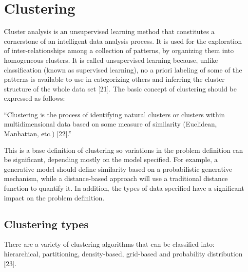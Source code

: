 \documentclass[
]{article}
\begin{document}
\hypertarget{clustering}{%
\section{\texorpdfstring{Clustering
\label{sec:clustering}}{Clustering }}\label{clustering}}

Cluster analysis is an unsupervised learning method that constitutes a
cornerstone of an intelligent data analysis process. It is used for the
exploration of inter-relationships among a collection of patterns, by
organizing them into homogeneous clusters. It is called unsupervised
learning because, unlike classification (known as supervised learning),
no a priori labeling of some of the patterns is available to use in
categorizing others and inferring the cluster structure of the whole
data set {[}21{]}. The basic concept of clustering should be expressed
as follows:

``Clustering is the process of identifying natural clusters or clusters
within multidimensional data based on some measure of similarity
(Euclidean, Manhattan, etc.) {[}22{]}.''

This is a base definition of clustering so variations in the problem
definition can be significant, depending mostly on the model specified.
For example, a generative model should define similarity based on a
probabilistic generative mechanism, while a distance-based approach will
use a traditional distance function to quantify it. In addition, the
types of data specified have a significant impact on the problem
definition.

\hypertarget{clustering-types}{%
\subsection{Clustering types}\label{clustering-types}}

There are a variety of clustering algorithms that can be classified
into: hierarchical, partitioning, density-based, grid-based and
probability distribution {[}23{]}.
\end{document}
